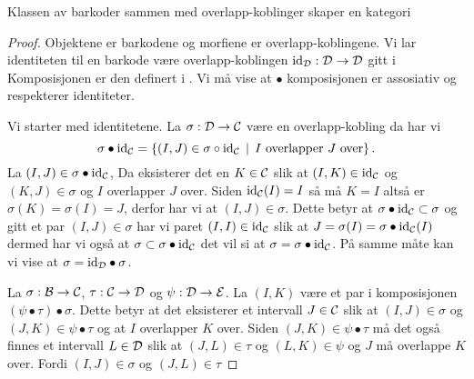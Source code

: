 \begin{teorem}
    Klassen av barkoder sammen med overlapp-koblinger skaper en kategori
\end{teorem}
\begin{proof}
    Objektene er barkodene og morfiene er overlapp-koblingene. Vi lar identiteten til en barkode være overlapp-koblingen $\textnormal{id}_{\mathcal{D}}:\mathcal{D}\to\mathcal{D}$ gitt i  Komposisjonen er den definert i . Vi må vise at $\bullet$ komposisjonen er assosiativ og respekterer identiteter.
    
    Vi starter med identitetene. La $\sigma: \mathcal{D}\to\mathcal{C}$ være en overlapp-kobling da har vi
    \[\sigma\bullet\textnormal{id}_{\mathcal{C}} = \left\{(I,J)\in\sigma\circ\textnormal{id}_{\mathcal{C}}\,\mid\,\text{$I$ overlapper $J$ over}\right\}.\]
    La $(I,J)\in \sigma\bullet\textnormal{id}_{\mathcal{C}}$, Da eksisterer det en $K\in\mathcal{C}$ slik at $(I,K)\in\textnormal{id}_{\mathcal{C}}$ og $(K,J)\in\sigma$ og $I$ overlapper $J$ over. Siden $\textnormal{id}_{\mathcal{C}}(I)=I$ så må $K=I$ altså er $\sigma(K)=\sigma(I)=J$, derfor har vi at $(I,J)\in\sigma$. Dette betyr at $\sigma\bullet\textnormal{id}_{\mathcal{C}}\subset\sigma$ og gitt et par $(I,J)\in\sigma$ har vi paret $(I,I)\in\textnormal{id}_{\mathcal{C}}$ slik at $J = \sigma(I) = \sigma\bullet\textnormal{id}_{\mathcal{C}}(I)$ dermed har vi også at $\sigma\subset\sigma\bullet\textnormal{id}_{\mathcal{C}}$ det vil si at $\sigma=\sigma\bullet\textnormal{id}_{\mathcal{C}}$. På samme måte kan vi vise at $\sigma = \textnormal{id}_{\mathcal{D}}\bullet\sigma$.

    La $\sigma:\mathcal{B}\to\mathcal{C}$, $\tau:\mathcal{C}\to\mathcal{D}$ og $\psi:\mathcal{D}\to\mathcal{E}$. La $(I,K)$ være et par i komposisjonen $(\psi\bullet\tau)\bullet\sigma$. Dette betyr at det eksisterer et intervall $J\in\mathcal{C}$ slik at $(I,J)\in\sigma$ og $(J,K)\in\psi\bullet\tau$ og at $I$ overlapper $K$ over. Siden $(J,K)\in\psi\bullet\tau$ må det også finnes et intervall $L\in\mathcal{D}$ slik at $(J,L)\in\tau$ og $(L,K)\in\psi$ og $J$ må overlappe $K$ over. Fordi $(I,J)\in\sigma$ og $(J,L)\in\tau$
\end{proof}